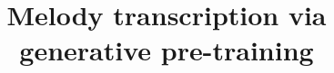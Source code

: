 \documentclass{article}
\title{
Melody transcription via generative pre-training
}
\begin{document}
\maketitle

\begin{abstract}

\end{abstract}




















\end{document}

